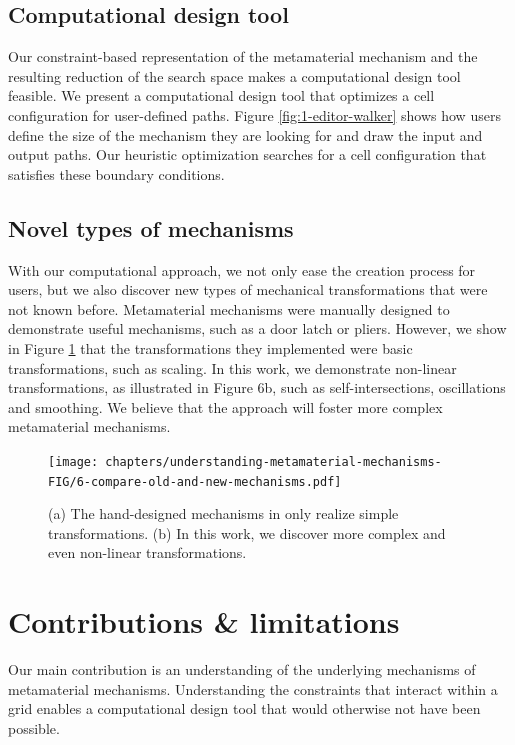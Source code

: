 \subsection{Computational design tool}

Our constraint-based representation of the metamaterial mechanism and the resulting reduction of the search space makes a computational design tool feasible. We present a computational design tool that optimizes a cell configuration for user-defined paths. Figure \ref{fig:1-editor-walker} shows how users define the size of the mechanism they are looking for and draw the input and output paths. Our heuristic optimization searches for a cell configuration that satisfies these boundary conditions. 


\subsection{Novel types of mechanisms}

With our computational approach, we not only ease the creation process for users, but we also discover new types of mechanical transformations that were not known before. Metamaterial mechanisms were manually designed to demonstrate useful mechanisms, such as a door latch or pliers. However, we show in Figure \ref{fig:6-compare-old-and-new-mechanisms} that the transformations they implemented were basic transformations, such as scaling. In this work, we demonstrate non-linear transformations, as illustrated in Figure 6b, such as self-intersections, oscillations and smoothing. We believe that the approach will foster more complex metamaterial mechanisms. 

\begin{figure} [h]
    \texttt{[image: chapters/understanding-metamaterial-mechanisms-FIG/6-compare-old-and-new-mechanisms.pdf]}
    \caption[Short figure name.]{(a) The hand-designed mechanisms in only realize simple transformations. (b) In this work, we discover more complex and even non-linear transformations.
    \label{fig:6-compare-old-and-new-mechanisms}}
\end{figure}


\section{Contributions \& limitations}

Our main contribution is an understanding of the underlying mechanisms of metamaterial mechanisms. Understanding the constraints that interact within a grid enables a computational design tool that would otherwise not have been possible.

